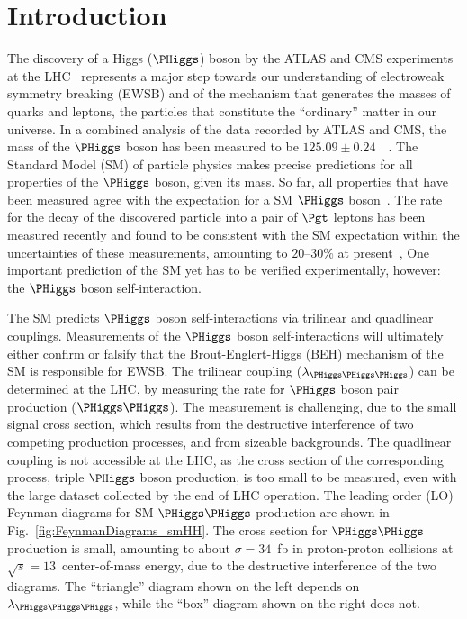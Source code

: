 \section{Introduction}
\label{sec:introduction}

The discovery of a Higgs ($\PHiggs$) boson by the ATLAS and CMS experiments at the LHC~\cite{Higgs-Discovery_CMS,Higgs-Discovery_ATLAS}
represents a major step towards our understanding of electroweak symmetry breaking (EWSB) 
and of the mechanism that generates the masses of quarks and leptons, the particles that constitute the ``ordinary'' matter in our universe.
In a combined analysis of the data recorded by ATLAS and CMS, 
the mass of the $\PHiggs$ boson has been measured to be $125.09 \pm 0.24$~\GeV~\cite{HIG-14-042}.
The Standard Model (SM) of particle physics makes precise predictions for all properties of the $\PHiggs$ boson, given its mass.
So far, all properties that have been measured agree with the expectation for a SM $\PHiggs$ boson~\cite{HIG-15-002}.
The rate for the decay of the discovered particle into a pair of $\Pgt$ leptons has been measured recently
and found to be consistent with the SM expectation within the uncertainties of these measurements, 
amounting to $20$--$30\%$ at present~\cite{HIG-13-004,Aad:2015vsa,HIG-15-002,HIG-16-043,ATLAS:2018lur},
One important prediction of the SM yet has to be verified experimentally, however:
the $\PHiggs$ boson self-interaction.

The SM predicts $\PHiggs$ boson self-interactions via trilinear and quadlinear couplings. 
Measurements of the $\PHiggs$ boson self-interactions will ultimately either confirm or falsify that the Brout-Englert-Higgs (BEH) mechanism of the SM is responsible for EWSB. 
The trilinear coupling ($\lambda_{\PHiggs\PHiggs\PHiggs}$) can be determined at the LHC, 
by measuring the rate for $\PHiggs$ boson pair production ($\PHiggs\PHiggs$). 
The measurement is challenging, due to the small signal cross section, 
which results from the destructive interference of two competing production processes, and from sizeable backgrounds. 
The quadlinear coupling is not accessible at the LHC, as the cross section of the corresponding process, 
triple $\PHiggs$ boson production, is too small to be measured, even with the large dataset collected by the end of LHC operation.
The leading order (LO) Feynman diagrams for SM $\PHiggs\PHiggs$ production are shown in Fig.~\ref{fig:FeynmanDiagrams_smHH}.
The cross section for $\PHiggs\PHiggs$ production is small, amounting to about $\sigma = 34$~fb in proton-proton collisions at $\sqrt{s}=13$~\TeV center-of-mass energy,
due to the destructive interference of the two diagrams.
The ``triangle'' diagram shown on the left depends on $\lambda_{\PHiggs\PHiggs\PHiggs}$,
while the ``box'' diagram shown on the right does not.

